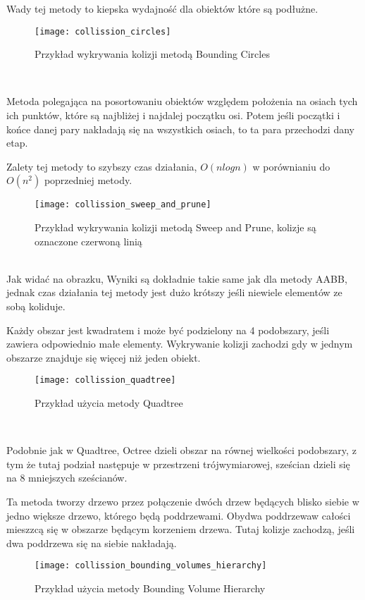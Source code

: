 Wady tej metody to kiepska wydajno\'sć dla obiektów które są podłużne.
\begin{figure}[h]
	\centering
	\noindent\texttt{[image: collission\_circles]}
	\caption{Przykład wykrywania kolizji metodą Bounding Circles}
\end{figure}\\
\newpage

\smallskip

Metoda polegająca na posortowaniu obiektów względem położenia na osiach tych ich punktów, które są najbliżej i najdalej początku osi. Potem je\'sli początki i końce danej pary nakładają się na wszystkich osiach, to ta para przechodzi dany etap.

Zalety tej metody to szybszy czas działania, $O(nlogn)$ w porównianiu do $O(n^{2})$ poprzedniej metody.
\begin{figure}[h]
	\centering
	\noindent\texttt{[image: collission\_sweep\_and\_prune]}
	\caption{Przykład wykrywania kolizji metodą Sweep and Prune, kolizje są oznaczone czerwoną linią}
\end{figure}\\
Jak widać na obrazku, Wyniki są dokładnie takie same jak dla metody AABB, jednak czas działania tej metody jest dużo krótszy je\'sli niewiele elementów ze sobą koliduje.
\newpage

\smallskip

Każdy obszar jest kwadratem i może być podzielony na 4 podobszary, je\'sli zawiera odpowiednio małe elementy. Wykrywanie kolizji zachodzi gdy w jednym obszarze znajduje się więcej niż jeden obiekt.\\
\begin{figure}[h]
	\centering
	\noindent\texttt{[image: collission\_quadtree]}
	\caption{Przykład użycia metody Quadtree}
\end{figure}\\

\smallskip

Podobnie jak w Quadtree, Octree dzieli obszar na równej wielko\'sci podobszary, z tym że tutaj podział następuje w przestrzeni trójwymiarowej, sze\'scian dzieli się na 8 mniejszych sze\'scianów.\\
\newpage
 
\smallskip

Ta metoda tworzy drzewo przez połączenie dwóch drzew będących blisko siebie w jedno większe drzewo, którego będą poddrzewami. Obydwa poddrzewaw cało\'sci mieszzcą się w obszarze będącym korzeniem drzewa. Tutaj kolizje zachodzą, je\'sli dwa poddrzewa się na siebie nakładają.\\
\begin{figure}[h]
	\centering
	\noindent\texttt{[image: collission\_bounding\_volumes\_hierarchy]}
	\caption{Przykład użycia metody Bounding Volume Hierarchy}
\end{figure}\\
\newpage

